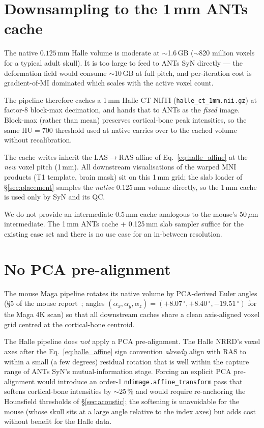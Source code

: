 \documentclass{compactarticle}
\begin{document}
\section{Downsampling to the 1\,mm ANTs cache}\label{sec:downsample}
The native $0.125$\,mm Halle volume is moderate at $\sim$1.6\,GB
($\sim$820 million voxels for a typical adult skull). It is too large
to feed to ANTs SyN directly --- the deformation field would consume
$\sim$10\,GB at full pitch, and per-iteration cost is gradient-of-MI
dominated which scales with the active voxel count.

The pipeline therefore caches a 1\,mm Halle CT NIfTI
(\texttt{halle\_ct\_1mm.nii.gz}) at factor-8 block-max decimation, and
hands that to ANTs as the {\em fixed} image. Block-max (rather than
mean) preserves cortical-bone peak intensities, so the same
$\mathrm{HU}=700$ threshold used at native carries over to the cached
volume without recalibration.

The cache writes inherit the LAS$\rightarrow$RAS affine of
Eq.~\ref{eq:halle_affine} at the {\em new} voxel pitch (1\,mm). All
downstream visualisations of the warped MNI products (T1 template,
brain mask) sit on this 1\,mm grid; the slab loader of
\S\ref{sec:placement} samples the {\em native} $0.125$\,mm volume
directly, so the 1\,mm cache is used only by SyN and its QC.

We do not provide an intermediate 0.5\,mm cache analogous to the
mouse's 50\,$\mu$m intermediate. The 1\,mm ANTs cache + 0.125\,mm slab
sampler suffice for the existing case set and there is no use case for
an in-between resolution.

\section{No PCA pre-alignment}\label{sec:prealign}
The mouse Maga pipeline rotates its native volume by PCA-derived Euler
angles (\S5 of the mouse report~\cite{maga_manuscript}; angles $(\alpha_x, \alpha_y,
\alpha_z) = (+8.07\,^\circ, +8.40\,^\circ, -19.51\,^\circ)$ for the
Maga 4K scan) so that all downstream caches share a clean axis-aligned
voxel grid centred at the cortical-bone centroid.

The Halle pipeline does {\em not} apply a PCA pre-alignment. The Halle
NRRD's voxel axes after the Eq.~\ref{eq:halle_affine} sign convention
{\em already} align with RAS to within a small (a few degrees) residual
rotation that is well within the capture range of ANTs SyN's
mutual-information stage. Forcing an explicit PCA pre-alignment would
introduce an order-1 \texttt{ndimage.affine\_transform} pass that
softens cortical-bone intensities by $\sim$25\,\% and would require
re-anchoring the Hounsfield thresholds of \S\ref{sec:acoustic}; the
softening is unavoidable for the mouse (whose skull sits at a large
angle relative to the index axes) but adds cost without benefit for the
Halle data.
\end{document}
